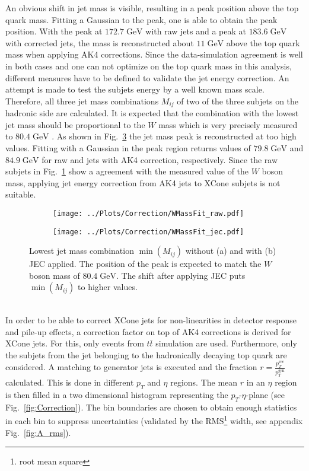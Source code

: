  	An obvious shift in jet mass is visible, resulting in a peak position above the top quark mass. Fitting a Gaussian to the peak, one is able to obtain the peak position. With the peak at $172.7\;\text{GeV}$ with raw jets and a peak at $183.6\;\text{GeV}$ with corrected jets, the mass is reconstructed about $11\;\text{GeV}$ above the top quark mass when applying AK4 corrections. Since the data-simulation agreement is well in both cases and one can not optimize on the top quark mass in this analysis, different measures have to be defined to validate the jet energy correction. An attempt is made to test the subjets energy by a well known mass scale. Therefore, all three jet mass combinations $M_{ij}$ of two of the three subjets on the hadronic side are calculated. It is expected that the combination with the lowest jet mass should be proportional to the $W$ mass which is very precisely measured to $80.4\;\text{GeV}$ \cite{Wmass}. As shown in Fig.~\ref{fig:Wmass} the jet mass peak is reconstructed at too high values. Fitting with a Gaussian in the peak region returns values of $79.8\;\text{GeV}$ and $84.9\;\text{GeV}$ for raw and jets with AK4 correction, respectively. Since the raw subjets in Fig.~\ref{fig:Wmass1} show a agreement with the measured value of the $W$ boson mass, applying jet energy correction from AK4 jets to XCone subjets is not suitable.
  	\begin{figure}[tb]
 		\begin{subfigure}{.5\textwidth}
 		\centering
		\texttt{[image: ../Plots/Correction/WMassFit\_raw.pdf]}
		\caption{}
 		\label{fig:Wmass1}
 		\end{subfigure}
 		\begin{subfigure}{.5\textwidth}
 		\centering
		\texttt{[image: ../Plots/Correction/WMassFit\_jec.pdf]}
 		\caption{}
 		\label{fig:Wmass2}
 		\end{subfigure} 
  		\caption{Lowest jet mass combination $\min(M_{ij})$ without (a) and with (b) JEC applied. The position of the peak is expected to match the $W$ boson mass of $80.4\;\text{GeV}$. The shift after applying JEC puts $\min(M_{ij})$ to higher values.} 
  		\label{fig:Wmass}
  	\end{figure}	
  	\\
	In order to be able to correct XCone jets for non-linearities in detector response and pile-up effects, a correction factor on top of AK4 corrections is derived for XCone jets. For this, only events from $t\bar{t}$ simulation are used. Furthermore, only the subjets from the jet belonging to the hadronically decaying top quark are considered. A matching to generator jets is executed and the fraction $r=\frac{p_T^{\text{rec}}}{p_T^{\text{gen}}}$ calculated. This is done in different $p_T$ and $\eta$ regions. The mean $r$ in an $\eta$ region is then filled in a two dimensional histogram representing the $p_T$-$\eta$-plane (see Fig.~\ref{fig:Correction}). The bin boundaries are chosen to obtain enough statistics in each bin to suppress uncertainties (validated by the RMS\footnote{root mean square} width, see appendix Fig.~\ref{fig:A_rms}). 
